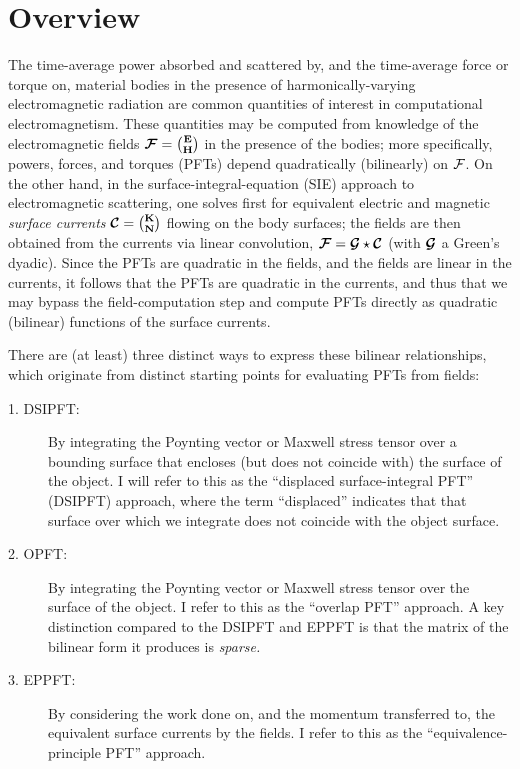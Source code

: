 \newpage
\section{Overview}

The time-average power absorbed and scattered by, and the
time-average force or torque on, material bodies in the presence
of harmonically-varying electromagnetic radiation
are common quantities of interest in computational electromagnetism.
These quantities may be computed from knowledge of the
electromagnetic fields $\boldsymbol{\mathcal{F}}={\mathbf{E} \choose \mathbf{H}}$ in the 
presence of the bodies; more specifically, powers, forces,
and torques (PFTs) depend quadratically (bilinearly) on $\mathcal{F}$.
On the other hand, in the surface-integral-equation (SIE) approach 
to electromagnetic scattering, one solves first for equivalent electric and 
magnetic \textit{surface currents} $\boldsymbol{\mathcal{C}}={\mathbf{K} \choose \mathbf{N}}$
flowing on the body surfaces; the fields are then obtained from
the currents via linear convolution, $\boldsymbol{\mathcal{F}}=\boldsymbol{\mathcal{G}} \star \boldsymbol{\mathcal{C}}$
(with $\boldsymbol{\mathcal{G}}$ a Green's dyadic). Since the PFTs are quadratic 
in the fields, and the fields are linear in the currents, it follows 
that the PFTs are quadratic in the currents, and thus that
we may bypass the field-computation step and compute PFTs directly 
as quadratic (bilinear) functions of the surface currents.

There are (at least) three distinct ways to express these
bilinear relationships, which originate from distinct
starting points for evaluating PFTs from fields:

\begin{description}

\item[1. DSIPFT:] By integrating the Poynting vector or Maxwell stress
tensor over a bounding surface that encloses (but does not
coincide with) the surface of the object. I will refer to this
as the ``displaced surface-integral PFT'' (DSIPFT) approach, where the term
``displaced'' indicates that that surface over which we integrate
does not coincide with the object surface.

\item[2. OPFT: ] By integrating the Poynting vector or Maxwell stress
tensor over the surface of the object. I refer to this
as the ``overlap PFT'' approach. A key distinction compared to
the DSIPFT and EPPFT is that the matrix of the bilinear form it
produces is \textit{sparse.}

\item[3. EPPFT: ] By considering the work done on, and the momentum
transferred to, the equivalent surface currents by the fields.
I refer to this as the ``equivalence-principle PFT'' approach.

\end{description}

